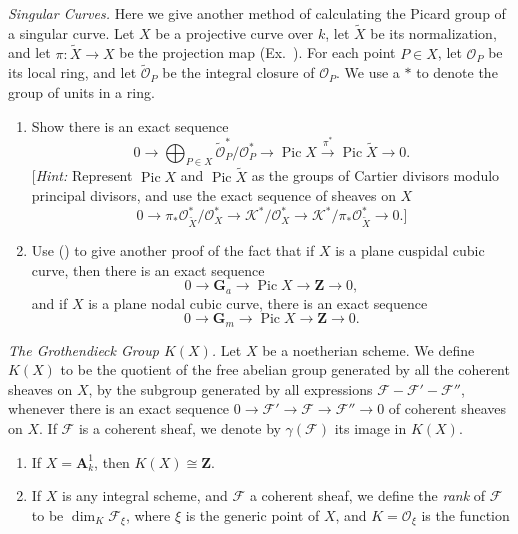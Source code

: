 { \emph{Singular Curves.} Here we give another method of calculating the Picard group of a singular curve. Let $X$ be a projective curve over $k$, let $\widetilde X$ be its normalization, and let $\pi\colon\widetilde X\to X$ be the projection map (Ex.\ ). For each point $P\in X$, let $\mathcal O_P$ be its local ring, and let $\widetilde{\mathcal O}_P$ be the integral closure of $\mathcal O_P$. We use a $*$ to denote the group of units in a ring.
\begin{enumerate}[label=(\alph*),leftmargin=2.7em,itemsep=0pt,topsep=1pt,parsep=0pt]
\item\hypertarget{ex-II-6.9a}{} Show there is an exact sequence
\[
  0\to\bigoplus_{P\in X}\widetilde{\mathcal O}_P^*/\mathcal O_P^*
    \to\operatorname{Pic}X\xrightarrow{\pi^*}\operatorname{Pic}\widetilde X\to0.
\]
[\emph{Hint:} Represent $\operatorname{Pic}X$ and $\operatorname{Pic}\widetilde X$ as the groups of Cartier divisors modulo principal divisors, and use the exact sequence of sheaves on $X$
\[
  0\to\pi_*\mathcal O_{\widetilde X}^*/\mathcal O_X^*
    \to\mathcal K^*/\mathcal O_X^*
    \to\mathcal K^*/\pi_*\mathcal O_{\widetilde X}^*\to0.\text{]}
\]
\item Use () to give another proof of the fact that if $X$ is a plane cuspidal cubic curve, then there is an exact sequence
\[
  0\to\mathbf G_a\to\operatorname{Pic}X\to\mathbf Z\to0,
\]
and if $X$ is a plane nodal cubic curve, there is an exact sequence
\[
  0\to\mathbf G_m\to\operatorname{Pic}X\to\mathbf Z\to0.
\]
\end{enumerate}

 \emph{The Grothendieck Group $K(X)$.} Let $X$ be a noetherian scheme. We define $K(X)$ to be the quotient of the free abelian group generated by all the coherent sheaves on $X$, by the subgroup generated by all expressions $\mathcal F-\mathcal F'-\mathcal F''$, whenever there is an exact sequence $0\to\mathcal F'\to\mathcal F\to\mathcal F''\to0$ of coherent sheaves on $X$. If $\mathcal F$ is a coherent sheaf, we denote by $\gamma(\mathcal F)$ its image in $K(X)$.
\begin{enumerate}[label=(\alph*),leftmargin=2.7em,itemsep=0pt,topsep=1pt,parsep=0pt]
\item If $X=\mathbf A_k^1$, then $K(X)\cong\mathbf Z$.
\item If $X$ is any integral scheme, and $\mathcal F$ a coherent sheaf, we define the \emph{rank} of $\mathcal F$ to be $\dim_K\mathcal F_\xi$, where $\xi$ is the generic point of $X$, and $K=\mathcal O_\xi$ is the function
\end{enumerate}
}
